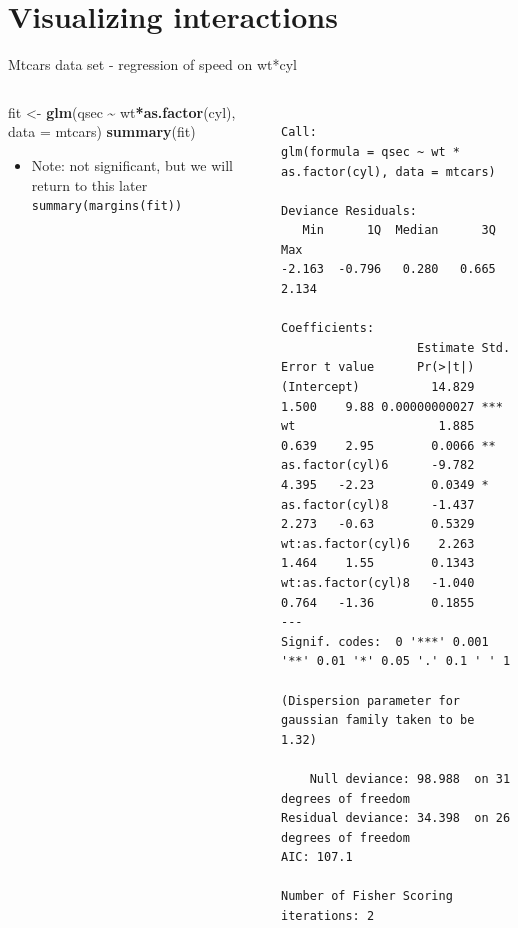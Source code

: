 \documentclass[australian,ignorenonframetext,aspectratio=169]{beamer}
\newenvironment{Shaded}{\begin{snugshade}}{\end{snugshade}}
\newcommand{\DataTypeTok}[1]{\textcolor[rgb]{0.13,0.29,0.53}{#1}}
\newcommand{\KeywordTok}[1]{\textcolor[rgb]{0.13,0.29,0.53}{\textbf{#1}}}
\newcommand{\NormalTok}[1]{#1}
\newcommand{\OperatorTok}[1]{\textcolor[rgb]{0.81,0.36,0.00}{\textbf{#1}}}
\newcommand{\StringTok}[1]{\textcolor[rgb]{0.31,0.60,0.02}{#1}}
\providecommand{\tightlist}{%
  \setlength{\itemsep}{0pt}\setlength{\parskip}{0pt}}
\begin{document}
\begin{frame}{}
\protect\hypertarget{section-1}{}

\section{Visualizing interactions}

\end{frame}

\begin{frame}[fragile]{Mtcars data set - regression of speed on wt*cyl}
\protect\hypertarget{mtcars-data-set---regression-of-speed-on-wtcyl}{}

\begin{columns}[T]
\begin{column}{0.5\textwidth}
\tiny

\begin{Shaded}
\begin{Highlighting}[]
\NormalTok{fit \textless{}{-}}\StringTok{ }\KeywordTok{glm}\NormalTok{(qsec }\OperatorTok{\textasciitilde{}}\StringTok{ }\NormalTok{wt}\OperatorTok{*}\KeywordTok{as.factor}\NormalTok{(cyl), }\DataTypeTok{data =}\NormalTok{ mtcars)}
\KeywordTok{summary}\NormalTok{(fit)}
\end{Highlighting}
\end{Shaded}

\begin{itemize}
\tightlist
\item
  Note: not significant, but we will return to this later
  \texttt{summary(margins(fit))}
\end{itemize}
\end{column}

\begin{column}{0.5\textwidth}
\tiny

\begin{verbatim}

Call:
glm(formula = qsec ~ wt * as.factor(cyl), data = mtcars)

Deviance Residuals: 
   Min      1Q  Median      3Q     Max  
-2.163  -0.796   0.280   0.665   2.134  

Coefficients:
                   Estimate Std. Error t value      Pr(>|t|)    
(Intercept)          14.829      1.500    9.88 0.00000000027 ***
wt                    1.885      0.639    2.95        0.0066 ** 
as.factor(cyl)6      -9.782      4.395   -2.23        0.0349 *  
as.factor(cyl)8      -1.437      2.273   -0.63        0.5329    
wt:as.factor(cyl)6    2.263      1.464    1.55        0.1343    
wt:as.factor(cyl)8   -1.040      0.764   -1.36        0.1855    
---
Signif. codes:  0 '***' 0.001 '**' 0.01 '*' 0.05 '.' 0.1 ' ' 1

(Dispersion parameter for gaussian family taken to be 1.32)

    Null deviance: 98.988  on 31  degrees of freedom
Residual deviance: 34.398  on 26  degrees of freedom
AIC: 107.1

Number of Fisher Scoring iterations: 2
\end{verbatim}
\end{column}
\end{columns}

\end{frame}
\end{document}
